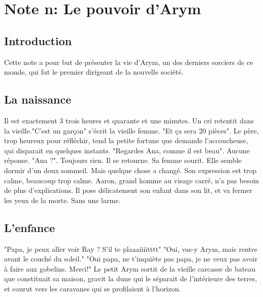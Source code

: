 \section{Note n: Le pouvoir d'Arym}
\subsection{Introduction}
Cette note a pour but de présenter la vie d'Arym, un des derniers sorciers de ce monde, qui fut le premier dirigeant de la nouvelle société.
\subsection{La naissance}
Il est exactement 3 trois heures et quarante et une minutes. Un cri retentit dans la vieille."C'est un garçon" s'écrit la vieille femme. "Et ça sera 20 pièces". Le père, trop heureux pour réfléchir, tend la petite fortune que demande l'accoucheuse, qui disparait en quelques instants.
\newline
"Regardes Ana, comme il est beau". Aucune réponse. "Ana ?". Toujours rien. Il se retourne. Sa femme sourit. Elle semble dormir d'un doux sommeil. Mais quelque chose a changé. Son expression est trop calme, beaucoup trop calme. Aaron, grand homme au visage carré, n'a pas besoin de plus d'explications. Il pose délicatement son enfant dans son lit, et va fermer les yeux de la morte. Sans une larme.
\subsection{L'enfance}
"Papa, je peux aller voir Ray ? S'il te plaaaiiiitttt"
\newline
"Oui, vas-y Arym, mais rentre avant le couché du soleil."
\newline
"Oui papa, ne t'inquiète pas papa, je ne veux pas avoir à faire aux gobelins. Merci!"
\newline
Le petit Arym sortit de la vieille carcasse de bateau que constituait sa maison, gravit la dune qui le séparait de l'intérieure des terres, et courut vers les caravanes qui se profilaient à l'horizon.